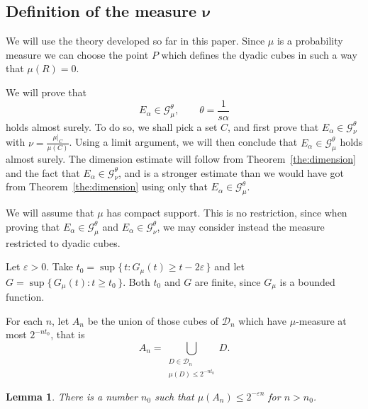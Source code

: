 \documentclass[10pt]{amsart}
\newtheorem{lemm}[theo]{Lemma}\newtheorem{prop}[theo]{Proposition}\newtheorem{coro}[theo]{Corollary}\newtheorem{conj}[theo]{Conjecture}
\theoremstyle{definition}\newtheorem{defi}[theo]{Definition}\newtheorem{rema}[theo]{Remark}\newtheorem{exam}[theo]{Example}\newtheorem{exem}[theo]{Example}\newtheorem{nota}[theo]{Notation}
\begin{document}
\subsection{Definition of the measure \texorpdfstring{$\boldsymbol{\nu}$}{}}

We will use the theory developed so far in this paper. Since $\mu$ is a probability measure we can choose the point $P$ which defines the dyadic cubes in such a way that $\mu (R) = 0$.

We will prove that
\begin{equation*}
E_\alpha \in \mathscr{G}_\mu^\theta, \qquad \theta = \frac{1}{s
\alpha}
\end{equation*}
holds almost surely. To do so, we shall pick a set $C$, and first prove that $E_\alpha \in \mathscr{G}_\nu^\theta$ with $\nu =
\frac{\mu|_C}{\mu (C)}$. Using a limit argument, we will then conclude that $E_\alpha \in \mathscr{G}_\mu^\theta$ holds almost surely. The dimension estimate will follow from Theorem~\ref{the:dimension} and the fact that $E_\alpha \in \mathscr{G}_\nu^\theta$, and is a stronger estimate than we would have got from Theorem~\ref{the:dimension} using only that $E_\alpha \in \mathscr{G}_\mu^\theta$.

We will assume that $\mu$ has compact support. This is no restriction, since when proving that $E_\alpha \in \mathscr{G}_\mu^\theta$ and $E_\alpha \in \mathscr{G}_\nu^\theta$, we may consider instead the measure restricted to dyadic cubes.

Let $\varepsilon > 0$. Take $t_0 = \sup \{\, t : G_\mu (t) \geq t - 2
\varepsilon \,\}$ and let $G = \sup \{\, G_\mu (t) : t \geq t_0
\,\}$. Both $t_0$ and $G$ are finite, since $G_\mu$ is a bounded function.

For each $n$, let $A_n$ be the union of those cubes of $\mathscr{D}_n$ which have $\mu$-measure at most $2^{- n t_0}$, that is
\[
A_n = \bigcup_{\substack{D \in \mathscr{D}_n \\ \mu (D) \leq 2^{-n t_0}}} D.
\]

\begin{lemm}\label{lem:t0}
There is a number $n_0$ such that $\mu (A_n) \leq 2^{- \varepsilon n}$ for $n > n_0$.
\end{lemm}
\end{document}
